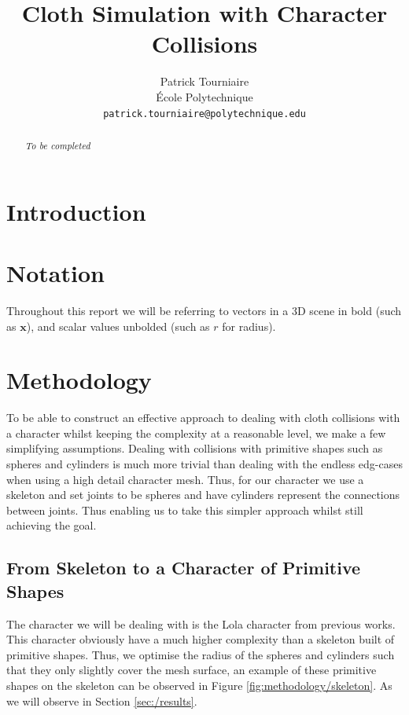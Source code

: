\documentclass{article}
\title{Cloth Simulation with Character Collisions}
\author{%
  Patrick Tourniaire \\
  École Polytechnique \\
  \texttt{patrick.tourniaire@polytechnique.edu}
}
\begin{document}
\maketitle


\begin{abstract}
  \textit{To be completed}
\end{abstract}


\section{Introduction}


\section{Notation}

Throughout this report we will be referring to vectors in a 3D scene in bold (such as $\mathbf{x}$), and 
scalar values unbolded (such as $r$ for radius).

\section{Methodology}

To be able to construct an effective approach to dealing with cloth collisions with a character
whilst keeping the complexity at a reasonable level, we make a few simplifying assumptions. Dealing
with collisions with primitive shapes such as spheres and cylinders is much more trivial than dealing with
the endless edg-cases when using a high detail character mesh. Thus, for our character we use a skeleton
and set joints to be spheres and have cylinders represent the connections between joints. Thus enabling
us to take this simpler approach whilst still achieving the goal. 

\subsection{From Skeleton to a Character of Primitive Shapes}

The character we will be dealing with is the Lola character from previous works. This character obviously
have a much higher complexity than a skeleton built of primitive shapes. Thus, we optimise the radius of
the spheres and cylinders such that they only slightly cover the mesh surface, an example of these primitive
shapes on the skeleton can be observed in Figure \ref{fig:methodology/skeleton}. As we will observe in Section
\ref{sec:/results}. 
\end{document}
